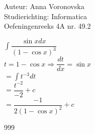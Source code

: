 \documentclass[a4paper]{article}
\begin{document}
  
\noindent \large Auteur: Anna Voronovska \\
\noindent \large Studierichting: Informatica\\
\noindent \large Oefeningenreeks 4A nr. 49.2\\

\medskip

\normalsize

$\displaystyle\int\dfrac{\sin xdx}{(1-\cos x)^3}$\\

$t = 1-\cos x \Rightarrow \dfrac{dt}{dx} = \sin x$\\

$= \displaystyle\int t^{-3}dt$\\

$= \dfrac{t^{-2}}{-2} + c$\\

$= \dfrac{-1}{2(1-\cos x)^2} + c$\\


\begin{thebibliography}{999}
\end{thebibliography}
\end{document}
